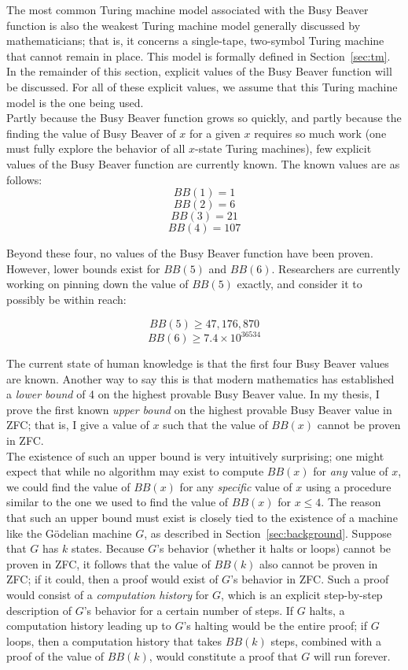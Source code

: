 \documentclass{report}
\begin{document}
The most common Turing machine model associated with the Busy Beaver function is also the weakest Turing machine model generally discussed by mathematicians; that is, it concerns a single-tape, two-symbol Turing machine that cannot remain in place. This model is formally defined in Section~\ref{sec:tm}. %
In the remainder of this section, explicit values of the Busy Beaver function will be discussed. For all of these explicit values, we assume that this Turing machine model is the one being used. \\

Partly because the Busy Beaver function grows so quickly, and partly because the finding the value of Busy Beaver of $x$ for a given $x$ requires so much work (one must fully explore the behavior of all $x$-state Turing machines), few explicit values of the Busy Beaver function are currently known. The known values are as follows: \\

$$BB(1) = 1$$
$$BB(2) = 6$$
$$BB(3) = 21$$
$$BB(4) = 107$$

Beyond these four, no values of the Busy Beaver function have been proven. However, lower bounds exist for $BB(5)$ and $BB(6)$. Researchers are currently working on pinning down the value of $BB(5)$ exactly, and consider it to possibly be within reach:

$$BB(5) \ge 47,176,870$$
$$BB(6) \ge 7.4 \times 10^{36534}$$

The current state of human knowledge is that the first four Busy Beaver values are known. Another way to say this is that modern mathematics has established a \emph{lower bound} of 4 on the highest provable Busy Beaver value. In my thesis, I prove the first known \emph{upper bound} on the highest provable Busy Beaver value in ZFC; that is, I give a value of $x$ such that the value of $BB(x)$ cannot be proven in ZFC. \\

The existence of such an upper bound is very intuitively surprising; one might expect that while no algorithm may exist to compute $BB(x)$ for \emph{any} value of $x$, we could find the value of $BB(x)$ for any \emph{specific} value of $x$ using a procedure similar to the one we used to find the value of $BB(x)$ for $x \le 4$. The reason that such an upper bound must exist is closely tied to the existence of a machine like the G\"{o}delian machine $G$, as described in Section~\ref{sec:background}. Suppose that $G$ has $k$ states. Because $G$'s behavior (whether it halts or loops) cannot be proven in ZFC, it follows that the value of $BB(k)$ also cannot be proven in ZFC; if it could, then a proof would exist of $G$'s behavior in ZFC. Such a proof would consist of a \emph{computation history} for $G$, which is an explicit step-by-step description of $G$'s behavior for a certain number of steps. If $G$ halts, a computation history leading up to $G$'s halting would be the entire proof; if $G$ loops, then a computation history that takes $BB(k)$ steps, combined with a proof of the value of $BB(k)$, would constitute a proof that $G$ will run forever. \\
\end{document}
